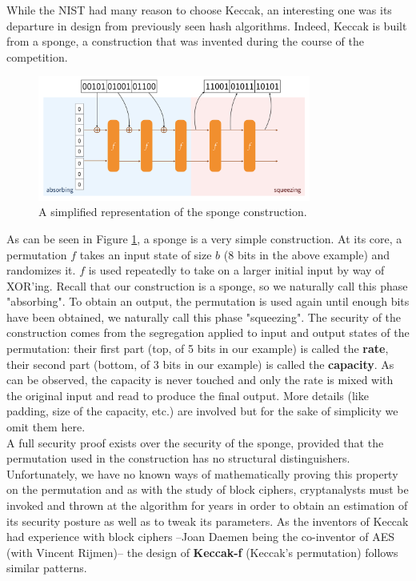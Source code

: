 \documentclass{article}
\begin{document}
While the NIST had many reason to choose Keccak, an interesting one was its departure in design from previously seen hash algorithms. Indeed, Keccak is built from a sponge, a construction that was invented during the course of the competition. 

\begin{figure}[H]
\centering
\includegraphics[width=0.8\textwidth]{rwcimg/sponge.png}
\caption{A simplified representation of the sponge construction.}
\label{fig:sponge}
\end{figure}

As can be seen in Figure \ref{fig:sponge}, a sponge is a very simple construction. At its core, a permutation $f$ takes an input state of size $b$ (8 bits in the above example) and randomizes it. $f$ is used repeatedly to take on a larger initial input by way of XOR'ing. Recall that our construction is a sponge, so we naturally call this phase  "absorbing". To obtain an output, the permutation is used again until enough bits have been obtained, we naturally call this phase "squeezing". The security of the construction comes from the segregation applied to input and output states of the permutation: their first part (top, of 5 bits in our example) is called the \textbf{rate}, their second part (bottom, of 3 bits in our example) is called the \textbf{capacity}. As can be observed, the capacity is never touched and only the rate is mixed with the original input and read to produce the final output. More details (like padding, size of the capacity, etc.) are involved but for the sake of simplicity we omit them here.\\

A full security proof\cite{sponge} exists over the security of the sponge, provided that the permutation used in the construction has no structural distinguishers. Unfortunately, we have no known ways of mathematically proving this property on the permutation and as with the study of block ciphers, cryptanalysts must be invoked and thrown at the algorithm for years in order to obtain an estimation of its security posture as well as to tweak its parameters. As the inventors of Keccak had experience with block ciphers --Joan Daemen being the co-inventor of AES (with Vincent Rijmen)-- the design of \textbf{Keccak-f} (Keccak's permutation) follows similar patterns.
\end{document}
